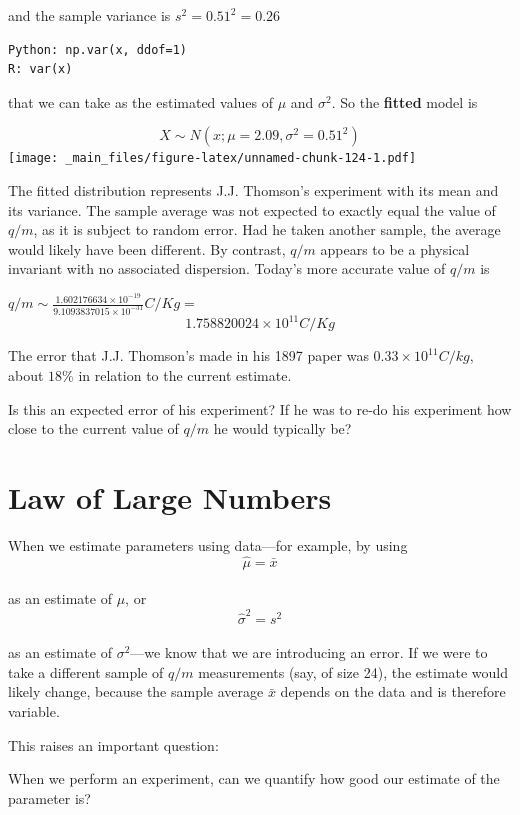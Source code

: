 \documentclass[
]{book}
\begin{document}
and the sample variance is \(s^2=0.51^2=0.26\)

\begin{verbatim}
Python: np.var(x, ddof=1)
R: var(x)
\end{verbatim}

that we can take as the estimated values of \(\mu\) and \(\sigma^2\). So the \textbf{fitted} model is

\[X \sim N(x; \mu=2.09, \sigma^2=0.51^2)\]
\texttt{[image: \_main\_files/figure-latex/unnamed-chunk-124-1.pdf]}

The fitted distribution represents J.J. Thomson's experiment with its mean and its variance. The sample average was not expected to exactly equal the value of \(q/m\), as it is subject to random error. Had he taken another sample, the average would likely have been different. By contrast, \(q/m\) appears to be a physical invariant with no associated dispersion. Today's more accurate value of \(q/m\) is

\(q/m \sim \frac{1.602176634\times 10^{-19}}{9.1093837015\times 10^{−31}} C/Kg =\) \[1.758820024\times 10^{11} C/Kg\]

The error that J.J. Thomson's made in his 1897 paper was \(0.33\times 10^{11} C/kg\), about \(18\%\) in relation to the current estimate.

Is this an expected error of his experiment? If he was to re-do his experiment how close to the current value of \(q/m\) he would typically be?

\hypertarget{law-of-large-numbers}{%
\section{Law of Large Numbers}\label{law-of-large-numbers}}

When we estimate parameters using data---for example, by using\\
\[
\hat{\mu} = \bar{x}
\]\\
as an estimate of \(\mu\), or\\
\[
\hat{\sigma}^2 = s^2
\]\\
as an estimate of \(\sigma^2\)---we know that we are introducing an error. If we were to take a different sample of \(q/m\) measurements (say, of size 24), the estimate would likely change, because the sample average \(\bar{x}\) depends on the data and is therefore variable.

This raises an important question:

When we perform an experiment, can we quantify how good our estimate of the parameter is?
\end{document}
